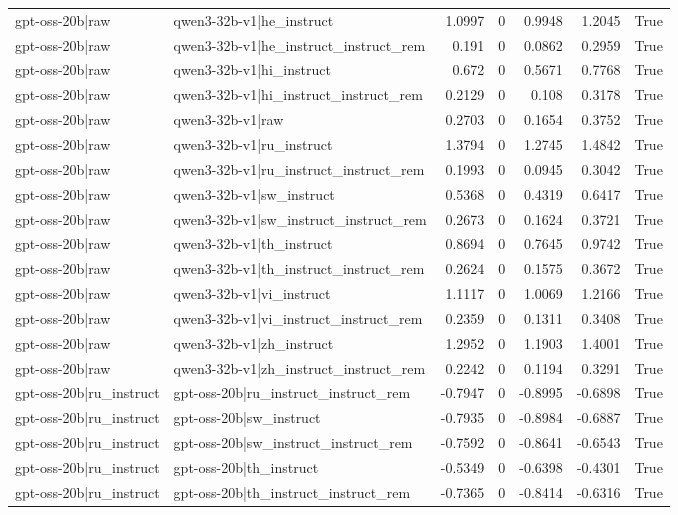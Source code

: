 \begin{table}
\begin{tabular}{l l r r r r l}
gpt-oss-20b|raw & qwen3-32b-v1|he_instruct & 1.0997 & 0 & 0.9948 & 1.2045 & True \\
gpt-oss-20b|raw & qwen3-32b-v1|he_instruct_instruct_rem & 0.191 & 0 & 0.0862 & 0.2959 & True \\
gpt-oss-20b|raw & qwen3-32b-v1|hi_instruct & 0.672 & 0 & 0.5671 & 0.7768 & True \\
gpt-oss-20b|raw & qwen3-32b-v1|hi_instruct_instruct_rem & 0.2129 & 0 & 0.108 & 0.3178 & True \\
gpt-oss-20b|raw & qwen3-32b-v1|raw & 0.2703 & 0 & 0.1654 & 0.3752 & True \\
gpt-oss-20b|raw & qwen3-32b-v1|ru_instruct & 1.3794 & 0 & 1.2745 & 1.4842 & True \\
gpt-oss-20b|raw & qwen3-32b-v1|ru_instruct_instruct_rem & 0.1993 & 0 & 0.0945 & 0.3042 & True \\
gpt-oss-20b|raw & qwen3-32b-v1|sw_instruct & 0.5368 & 0 & 0.4319 & 0.6417 & True \\
gpt-oss-20b|raw & qwen3-32b-v1|sw_instruct_instruct_rem & 0.2673 & 0 & 0.1624 & 0.3721 & True \\
gpt-oss-20b|raw & qwen3-32b-v1|th_instruct & 0.8694 & 0 & 0.7645 & 0.9742 & True \\
gpt-oss-20b|raw & qwen3-32b-v1|th_instruct_instruct_rem & 0.2624 & 0 & 0.1575 & 0.3672 & True \\
gpt-oss-20b|raw & qwen3-32b-v1|vi_instruct & 1.1117 & 0 & 1.0069 & 1.2166 & True \\
gpt-oss-20b|raw & qwen3-32b-v1|vi_instruct_instruct_rem & 0.2359 & 0 & 0.1311 & 0.3408 & True \\
gpt-oss-20b|raw & qwen3-32b-v1|zh_instruct & 1.2952 & 0 & 1.1903 & 1.4001 & True \\
gpt-oss-20b|raw & qwen3-32b-v1|zh_instruct_instruct_rem & 0.2242 & 0 & 0.1194 & 0.3291 & True \\
gpt-oss-20b|ru_instruct & gpt-oss-20b|ru_instruct_instruct_rem & -0.7947 & 0 & -0.8995 & -0.6898 & True \\
gpt-oss-20b|ru_instruct & gpt-oss-20b|sw_instruct & -0.7935 & 0 & -0.8984 & -0.6887 & True \\
gpt-oss-20b|ru_instruct & gpt-oss-20b|sw_instruct_instruct_rem & -0.7592 & 0 & -0.8641 & -0.6543 & True \\
gpt-oss-20b|ru_instruct & gpt-oss-20b|th_instruct & -0.5349 & 0 & -0.6398 & -0.4301 & True \\
gpt-oss-20b|ru_instruct & gpt-oss-20b|th_instruct_instruct_rem & -0.7365 & 0 & -0.8414 & -0.6316 & True \\

\end{tabular}
\end{table}
